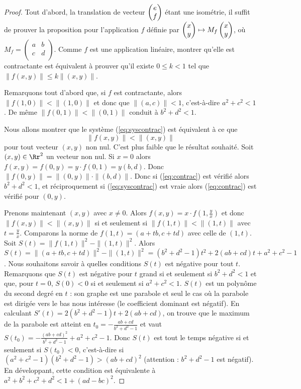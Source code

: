 \documentclass[11pt,class=report,crop=false]{standalone}
\begin{document}
\begin{proof}
Tout d'abord, la translation de vecteur $\begin{pmatrix}e \\ f\end{pmatrix}$ étant une isométrie, il suffit de prouver
la proposition pour l'application $f$ définie par 
 $\begin{pmatrix}x \\ y\end{pmatrix} \mapsto M_f
\begin{pmatrix}x \\ y\end{pmatrix}$, où $M_f= \begin{pmatrix}a & b \\ c & d \\  \end{pmatrix}$. 
Comme $f$ est une application linéaire, montrer qu'elle est contractante est équivalent à prouver qu'il existe
$0 \le k < 1$ tel que
$\|f(x,y)\| \le k \|(x,y) \|$.

\bigskip

Remarquons tout d'abord que, si $f$ est contractante, alors
$\|f(1,0)\| < \|(1,0)\|$ et donc que $\|(a,c)\| < 1$, c'est-à-dire $a^2+c^2<1$.
De même $\|f(0,1)\| < \|(0,1)\|$ conduit à $b^2+d^2<1$.



Nous allons montrer que le système (\ref{eq:syscontrac}) est équivalent à ce que 
\begin{equation}
\label{eq:contrac}
\|f(x,y)\| < \|(x,y) \|
\end{equation}
pour tout vecteur $(x,y)$ non nul. C'est plus faible que le résultat souhaité.
Soit $(x,y) \in \Rr^2$ un vecteur non nul. Si $x=0$ alors 
$f(x,y)=f(0,y)=y\cdot f(0,1)=y(b,d)$. Donc $\|f(0,y)\| = \|(0,y)\|\cdot \|(b,d)\|$.
Donc si (\ref{eq:contrac}) est vérifié alors $b^2+d^2<1$, et réciproquement si (\ref{eq:syscontrac}) est vraie
alors (\ref{eq:contrac}) est vérifié pour $(0,y)$.

Prenons maintenant $(x,y)$ avec $x\neq 0$. Alors $f(x,y)=x \cdot f(1,\frac yx)$ et donc 
$\|f(x,y)\| < \|(x,y) \|$  si et seulement si $\|f(1,t)\| < \|(1,t) \|$ avec $t = \frac yx$.
Comparons la norme de $f(1,t)=(a+tb,c+td)$ avec celle de $(1,t)$.
Soit $S(t)= \|f(1,t) \|^2 - \| (1,t)\|^2$. Alors 
$S(t)=\|(a+tb,c+td) \|^2 - \| (1,t)\|^2 = (b^2+d^2-1)t^2+2(ab+cd)t+a^2+c^2-1$.
Nous souhaitons savoir à quelles conditions $S(t)$ est négative pour tout $t$.
Remarquons que $S(t)$ est négative pour $t$ grand si et seulement si
$b^2+d^2 < 1$ et que, pour $t=0$,  $S(0)<0$ si et seulement si $a^2+c^2<1$.
$S(t)$ est un polynôme du second degré en $t$ : son graphe est une parabole et
seul le cas où la parabole est dirigée vers le bas nous intéresse (le coefficient dominant est négatif).
En calculant $S'(t)= 2(b^2+d^2-1)t+2(ab+cd)$, on trouve que le maximum de la parabole est atteint en 
$t_0= -\frac{ab+cd}{b^2+d^2-1}$ et vaut $S(t_0)= -\frac{(ab+cd)^2}{b^2+d^2-1}+a^2+c^2-1$.
Donc $S(t)$ est tout le temps négative si et seulement si $S(t_0)<0$,
c'est-à-dire si $(a^2+c^2-1)(b^2+d^2-1) > (ab+cd)^2$ (attention : $b^2+d^2-1$ est négatif).
En développant, cette condition est équivalente à
$a^2+b^2+c^2+d^2 < 1 + (ad-bc)^2$.


\end{proof}
\end{document}
